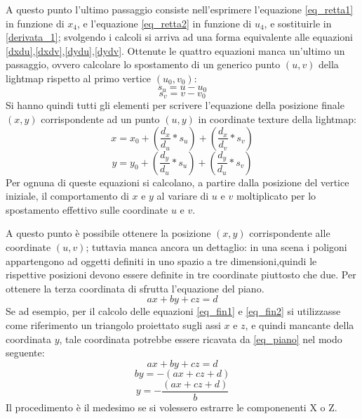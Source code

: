 A questo punto l’ultimo passaggio consiste nell'esprimere l'equazione \ref{eq_retta1} in funzione di $x_4$, e l'equazione \ref{eq_retta2} in funzione di $u_4$, e sostituirle in \ref{derivata_1}; svolgendo i calcoli si arriva ad una forma equivalente alle equazioni \ref{dxdu},\ref{dxdv},\ref{dydu},\ref{dydv}. 
Ottenute le quattro equazioni manca un’ultimo un passaggio, ovvero calcolare lo spostamento di un generico punto $(u,v)$ della lightmap rispetto al primo vertice $(u_0,v_0)$:
\begin{equation}
s_u = u - u_0
\end{equation}
\begin{equation}
s_v = v - v_0
\end{equation}
Si hanno quindi tutti gli elementi per scrivere l’equazione della posizione finale $(x,y)$ corrispondente ad un punto $(u,y)$ in coordinate texture della lightmap:
\begin{equation}
x = x_0 + (\frac{d_x}{d_u} * s_u) + (\frac{d_x}{d_v} * s_v)
\label{eq_fin1}
\end{equation}
\begin{equation}
y = y_0 + (\frac{d_y}{d_u} * s_u) + (\frac{d_y}{d_u} * s_v)
\label{eq_fin2}
\end{equation}
Per ognuna di queste equazioni si calcolano, a partire dalla posizione del vertice iniziale, il comportamento di $x$ e $y$ al variare di $u$ e $v$ moltiplicato per lo spostamento effettivo sulle coordinate $u$ e $v$.

A questo punto è possibile ottenere la posizione $(x,y)$ corrispondente alle coordinate $(u,v)$; tuttavia  manca ancora un dettaglio: in una scena i poligoni appartengono ad oggetti definiti in uno spazio a tre dimensioni,quindi le rispettive posizioni devono essere definite in tre coordinate piuttosto che due. 
Per ottenere la terza coordinata di sfrutta l’equazione del piano. 
\begin{equation}
ax + by + cz = d
\label{eq_piano}
\end{equation}
Se ad esempio, per il calcolo delle equazioni \ref{eq_fin1} e \ref{eq_fin2} si utilizzasse come riferimento un triangolo proiettato sugli assi $x$ e $z$, e quindi mancante della coordinata $y$, tale coordinata potrebbe essere ricavata da \ref{eq_piano} nel modo seguente:
\begin{equation}
ax + by + cz = d
\end{equation}
\begin{equation}
by = -(ax + cz + d)
\end{equation}
\begin{equation}
y = - \frac{(ax + cz + d)}{b}
\end{equation}
Il procedimento è il medesimo se si volessero estrarre le componenenti X o Z.

